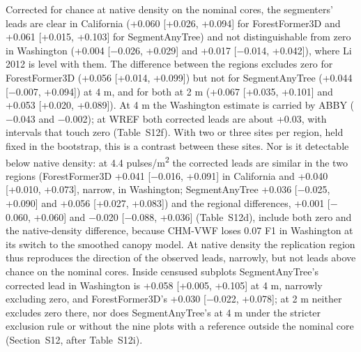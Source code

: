 \documentclass[10pt,a4paper]{article}
\begin{document}
Corrected for chance at native density on the nominal cores, the segmenters'
leads are clear in California (+0.060 [+0.026, +0.094] for ForestFormer3D and
+0.061 [+0.015, +0.103] for SegmentAnyTree) and not distinguishable from zero in
Washington (+0.004 [$-$0.026, +0.029] and +0.017 [$-$0.014, +0.042]), where Li 2012
is level with them. The difference between the regions excludes zero for
ForestFormer3D (+0.056 [+0.014, +0.099]) but not for SegmentAnyTree (+0.044
[$-$0.007, +0.094]) at 4 m, and for both at 2 m (+0.067 [+0.035, +0.101] and
+0.053 [+0.020, +0.089]). At 4 m the Washington estimate is carried by ABBY
($-$0.043 and $-$0.002); at WREF both corrected leads are about +0.03, with
intervals that touch zero (Table~S12f). With two or three sites per region, held
fixed in the bootstrap, this is a contrast between these sites. Nor is it
detectable below native density: at 4.4 pulses/m\textsuperscript{2} the corrected leads are
similar in the two regions (ForestFormer3D +0.041 [$-$0.016, +0.091] in California
and +0.040 [+0.010, +0.073], narrow, in Washington; SegmentAnyTree +0.036
[$-$0.025, +0.090] and +0.056 [+0.027, +0.083]) and the regional differences,
+0.001 [$-$0.060, +0.060] and $-$0.020 [$-$0.088, +0.036] (Table~S12d), include both
zero and the native-density difference, because CHM-VWF loses 0.07 F1 in
Washington at its switch to the smoothed canopy model. At native density the
replication region thus reproduces the direction of the observed leads,
narrowly, but not leads above chance on the nominal cores. Inside censused
subplots SegmentAnyTree's corrected lead in Washington is +0.058 [+0.005,
+0.105] at 4 m, narrowly excluding zero, and ForestFormer3D's +0.030 [$-$0.022,
+0.078]; at 2 m neither excludes zero there, nor does SegmentAnyTree's at 4 m
under the stricter exclusion rule or without the nine plots with a reference
outside the nominal core (Section~S12, after Table~S12i).
\end{document}

